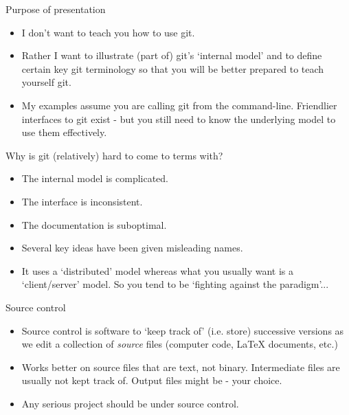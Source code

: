 \documentclass[usenames,dvipsnames]{beamer}
\begin{document}
\begin{frame}{Purpose of presentation}
  \begin{block}{}
    \begin{itemize}
      \item{I don't want to teach you how to use git.}
      \item{Rather I want to illustrate (part of) git's `internal model' and to define certain key git terminology so that you will be better prepared to teach yourself git.}
      \item{My examples assume you are calling git from the command-line. Friendlier interfaces to git exist - but you still need to know the underlying model to use them effectively.}
    \end{itemize}
  \end{block}
\end{frame}


\begin{frame}{Why is git (relatively) hard to come to terms with?}
  \begin{block}{}
    \begin{itemize}
      \item{The internal model is complicated.}
      \item{The interface is inconsistent.}
      \item{The documentation is suboptimal.}
      \item{Several key ideas have been given misleading names.}
      \item{It uses a `distributed' model whereas what you usually want is a `client/server' model. So you tend to be `fighting against the paradigm'...}
    \end{itemize}
  \end{block}
\end{frame}

\begin{frame}{Source control}
  \begin{block}{}
    \begin{itemize}
      \item{Source control is software to `keep track of' (i.e. store) successive versions as we edit a collection of \textit{source} files (computer code, \LaTeX{} documents, etc.)}
      \item{Works better on source files that are text, not binary. Intermediate files are usually not kept track of. Output files might be - your choice.}
      \item{Any serious project should be under source control.}
    \end{itemize}
  \end{block}
\end{frame}
\end{document}
